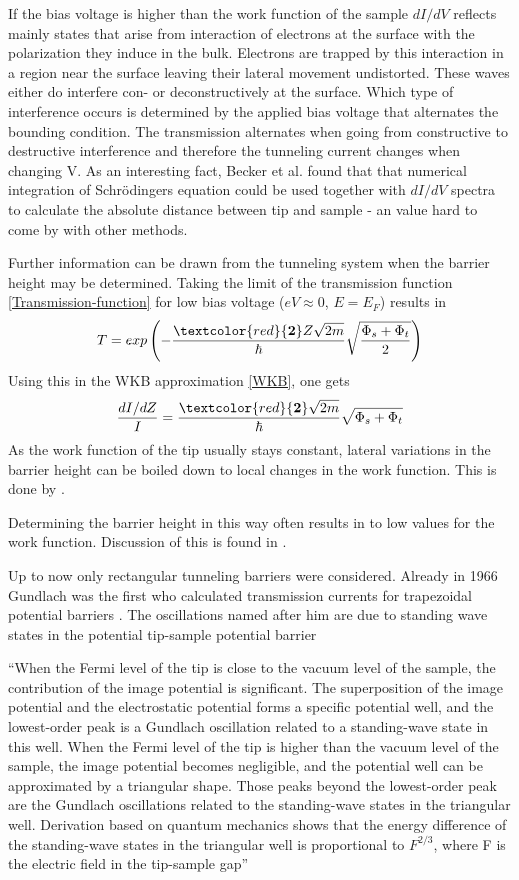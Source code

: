 If the bias voltage is higher than the work function of the sample $dI/dV$ reflects mainly states that arise from interaction of electrons at the surface with the polarization they induce in the bulk. Electrons are trapped by this interaction in a region near the surface leaving their lateral movement undistorted. These waves either do interfere con- or deconstructively at the surface. Which type of interference occurs is determined by the applied bias voltage that alternates the bounding condition. The transmission alternates when going from constructive to destructive interference and therefore the tunneling current changes when changing V. 
As an interesting fact, Becker et al.\cite{becker_electron_1985} found that that numerical integration of Schr\"odingers equation could be used together with $dI/dV$ spectra to calculate the absolute distance between tip and sample - an value hard to come by with other methods.

Further information can be drawn from the tunneling system when the barrier height may be determined.
Taking the limit of the transmission function \eqref{Transmission-function} for low bias voltage ($eV\approx0$, $E=E_F$) results in 
$$T=exp\left(-\frac{\textcolor{red}{\textbf{2}}Z\sqrt{2m}}{\hbar}\sqrt{\frac{\Phi_s+\Phi_t}{2}}\right)$$
Using this in the WKB approximation \eqref{WKB}, one gets $$\frac{dI/dZ}{I}=\frac{\textcolor{red}{\textbf{2}}\sqrt{2m}}{\hbar}\sqrt{\Phi_s+\Phi_t}$$
As the work function of the tip usually stays constant, lateral variations in the barrier height can be boiled down to local changes in the work function. This is done by \cite{jia_variation_1998}.

Determining the barrier height in this way often results in to low values for the work function. Discussion of this is found in \cite[96]{bonnell_scanning_1993}.

Up to now only rectangular tunneling barriers were considered.
Already in 1966 Gundlach was the first who calculated transmission currents for trapezoidal potential barriers \cite{gundlach_zur_1966}. The oscillations named after him are due to standing wave states in the potential tip-sample potential barrier \cite{binnig_tunneling_1985,becker_electron_1985}

``When the Fermi level of the tip is close to the vacuum level of  the  sample,  the  contribution  of  the  image  potential  is significant. The superposition of the  image  potential  and the electrostatic  potential forms a specific potential well, and the lowest-order peak is a Gundlach oscillation related to a standing-wave state in this well. When the Fermi level of the tip is higher than the vacuum level of the sample, the image potential becomes negligible, and the potential well can be  approximated  by a triangular  shape. Those peaks beyond the lowest-order peak are the Gundlach oscillations related to the standing-wave states in the triangular well. Derivation  based  on  quantum  mechanics  shows  that  the energy difference of the standing-wave states in the triangular  well  is  proportional  to $F^{2/3}$,  where F is  the electric field in the tip-sample gap''\cite{lin_manifestation_2007}

